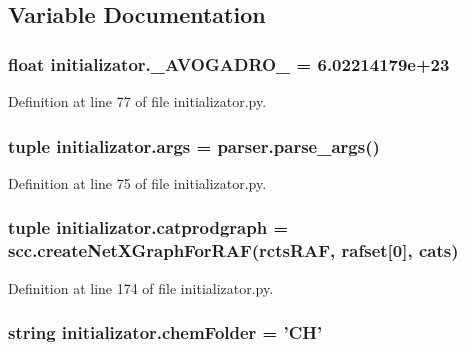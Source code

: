 \subsection{Variable Documentation}
\hypertarget{a00104_a01b3b6a0972397f230c35bd2fb8effc4}{
\subsubsection[{\-\_\-\-A\-V\-O\-G\-A\-D\-R\-O\-\_\-}]{\setlength{\rightskip}{0pt plus 5cm}float initializator.\-\_\-\-A\-V\-O\-G\-A\-D\-R\-O\-\_\- = 6.\-02214179e+23}}\label{a00104_a01b3b6a0972397f230c35bd2fb8effc4}


Definition at line 77 of file initializator.\-py.

\hypertarget{a00104_aedb2e5b77a354ccd69d9d38b3c30f61a}{
\subsubsection[{args}]{\setlength{\rightskip}{0pt plus 5cm}tuple initializator.\-args = parser.\-parse\-\_\-args()}}\label{a00104_aedb2e5b77a354ccd69d9d38b3c30f61a}


Definition at line 75 of file initializator.\-py.

\hypertarget{a00104_a9dbf1186829962911d9d9672136cb218}{
\subsubsection[{catprodgraph}]{\setlength{\rightskip}{0pt plus 5cm}tuple initializator.\-catprodgraph = scc.\-create\-Net\-X\-Graph\-For\-R\-A\-F({\bf rcts\-R\-A\-F}, {\bf rafset}\mbox{[}0\mbox{]}, cats)}}\label{a00104_a9dbf1186829962911d9d9672136cb218}


Definition at line 174 of file initializator.\-py.

\hypertarget{a00104_a4a57e1e8a830824b985f34ee1af52b93}{
\subsubsection[{chem\-Folder}]{\setlength{\rightskip}{0pt plus 5cm}string initializator.\-chem\-Folder = 'C\-H'}}\label{a00104_a4a57e1e8a830824b985f34ee1af52b93}


